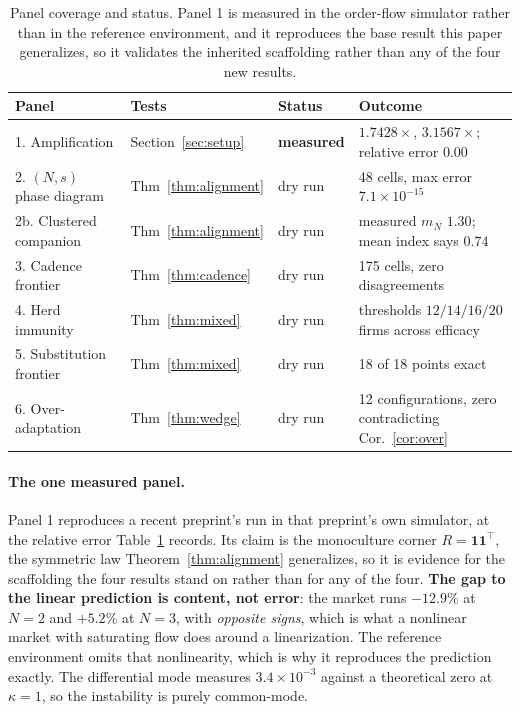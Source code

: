 \documentclass{article}
\theoremstyle{plain}
\theoremstyle{definition}
\newcommand{\mN}{m_N}
\begin{document}
\begin{table}[t]
\centering
\caption{Panel coverage and status. Panel 1 is measured in the order-flow simulator rather than in the reference environment, and it reproduces the base result this paper generalizes, so it validates the inherited scaffolding rather than any of the four new results.}
\label{tab:panels}
\small
\begin{tabular}{llll}
\toprule
Panel & Tests & Status & Outcome \\
\midrule
1. Amplification & Section~\ref{sec:setup} & \textbf{measured} & $1.7428\times$, $3.1567\times$; relative error $0.00$ \\
2. $(N,s)$ phase diagram & Thm~\ref{thm:alignment} & dry run & 48 cells, max error $7.1\times 10^{-15}$ \\
2b. Clustered companion & Thm~\ref{thm:alignment} & dry run & measured $\mN$ $1.30$; mean index says $0.74$ \\
3. Cadence frontier & Thm~\ref{thm:cadence} & dry run & 175 cells, zero disagreements \\
4. Herd immunity & Thm~\ref{thm:mixed} & dry run & thresholds $12/14/16/20$ firms across efficacy \\
5. Substitution frontier & Thm~\ref{thm:mixed} & dry run & 18 of 18 points exact \\
6. Over-adaptation & Thm~\ref{thm:wedge} & dry run & 12 configurations, zero contradicting Cor.~\ref{cor:over} \\
\bottomrule
\end{tabular}
\end{table}

\paragraph{The one measured panel.}
Panel 1 reproduces a recent preprint's run in that preprint's own simulator, at the relative error Table~\ref{tab:panels} records. Its claim is the monoculture corner $R = \mathbf{1}\mathbf{1}^{\top}$, the symmetric law Theorem~\ref{thm:alignment} generalizes, so it is evidence for the scaffolding the four results stand on rather than for any of the four. \textbf{The gap to the linear prediction is content, not error}: the market runs $-12.9\%$ at $N=2$ and $+5.2\%$ at $N=3$, with \emph{opposite signs}, which is what a nonlinear market with saturating flow does around a linearization. The reference environment omits that nonlinearity, which is why it reproduces the prediction exactly. The differential mode measures $3.4\times 10^{-3}$ against a theoretical zero at $\kappa=1$, so the instability is purely common-mode.
\end{document}
